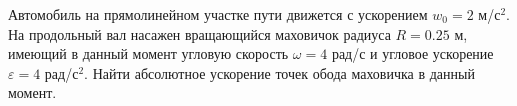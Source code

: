 Автомобиль на прямолинейном участке пути
движется с ускорением $w_0 = 2$ м/с$^2$.
На продольный вал насажен вращающийся маховичок радиуса $R = 0.25$ м,
имеющий в данный момент угловую скорость $\omega = 4$ рад/с
и угловое ускорение $\varepsilon = 4$ рад/с$^2$.
Найти абсолютное ускорение точек обода маховичка в данный момент.
